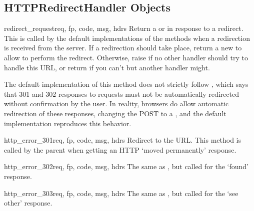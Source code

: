 \subsection{HTTPRedirectHandler Objects \label{http-redirect-handler}}


\begin{methoddesc}[HTTPRedirectHandler]{redirect_request}{req,
                                                  fp, code, msg, hdrs}
Return a  or  in response to a redirect.
This is called by the default implementations of the
 methods when a redirection is received from
the server.  If a redirection should take place, return a new
 to allow  to perform the
redirect.  Otherwise, raise  if no other handler
should try to handle this URL, or return  if you can't but
another handler might.

\begin{notice}
 The default implementation of this method does not strictly
 follow , which says that 301 and 302 responses to 
 requests must not be automatically redirected without confirmation by
 the user.  In reality, browsers do allow automatic redirection of
 these responses, changing the POST to a , and the default
 implementation reproduces this behavior.
\end{notice}
\end{methoddesc}


\begin{methoddesc}[HTTPRedirectHandler]{http_error_301}{req,
                                                  fp, code, msg, hdrs}
Redirect to the  URL.  This method is called by
the parent  when getting an HTTP
`moved permanently' response.
\end{methoddesc}

\begin{methoddesc}[HTTPRedirectHandler]{http_error_302}{req,
                                                  fp, code, msg, hdrs}
The same as , but called for the
`found' response.
\end{methoddesc}

\begin{methoddesc}[HTTPRedirectHandler]{http_error_303}{req,
                                                  fp, code, msg, hdrs}
The same as , but called for the
`see other' response.
\end{methoddesc}

